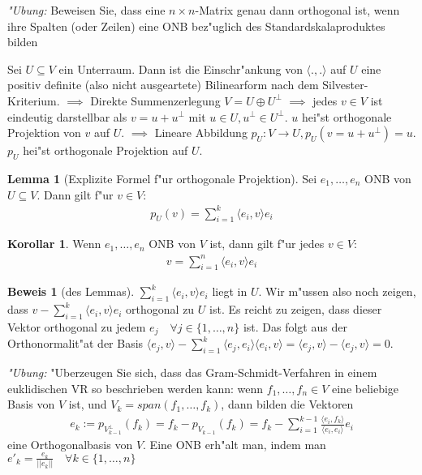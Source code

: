 \documentclass[oneside,fontsize=11pt,paper=a4,BCOR=0mm,DIV=12,automark,headsepline]{scrbook}
\theoremstyle{remark}
\theoremstyle{definition}
\newtheorem{lemma}{Lemma}[section]
\newtheorem*{korollar}{Korollar}
\theoremstyle{definition}
\newtheorem*{prof}{Beweis}
\theoremstyle{remark}
\begin{document}
  \emph{"Ubung:} Beweisen Sie, dass eine \(n\times n\)-Matrix genau dann orthogonal ist, wenn ihre Spalten (oder Zeilen) eine ONB bez"uglich des Standardskalaproduktes bilden

  Sei \(U\subseteq V\) ein Unterraum. Dann ist die Einschr"ankung von \(\langle ., .\rangle\) auf \(U\) eine positiv definite (also nicht ausgeartete) Bilinearform nach dem Silvester-Kriterium. \(\implies\) Direkte Summenzerlegung \(V = U\oplus U^\perp\) \(\implies\) jedes \(v\in V\) ist eindeutig darstellbar als \(v = u + u^\perp\) mit \(u\in U, u^\perp \in U^\perp\). \(u\) hei"st orthogonale Projektion von \(v\) auf \(U\). \(\implies\) Lineare Abbildung \(p_U: V\to U, p_U(v = u + u^\perp) = u\). \(p_U\) hei"st orthogonale Projektion auf \(U\).

\begin{lemma}[Explizite Formel f"ur orthogonale Projektion]
  Sei \(e_1, \dots, e_n\) ONB von \(U \subseteq V\). Dann gilt f"ur \(v\in V\):
  \begin{align*}
    p_U(v) = \sum_{i=1}^k\langle e_i, v\rangle e_i
  \end{align*}
\end{lemma}
\begin{korollar}
  Wenn \(e_1,\dots, e_n\) ONB von \(V\) ist, dann gilt f"ur jedes \(v \in V\):
  \begin{align*}
    v = \sum_{i=1}^n\langle e_i, v\rangle e_i
  \end{align*}
\end{korollar}
\begin{prof}[des Lemmas]
  \(\sum_{i=1}^k \langle e_i, v\rangle e_i\) liegt in \(U\). Wir m"ussen also noch zeigen, dass \(v - \sum_{i=1}^k\langle e_i, v\rangle e_i\) orthogonal zu \(U\) ist. Es reicht zu zeigen, dass dieser Vektor orthogonal zu jedem \(e_j \quad\forall j \in \{1,\dots, n\}\) ist. Das folgt aus der Orthonormalit"at der Basis \(\langle e_j, v\rangle - \sum_{i=1}^k \langle e_j, e_i\rangle\langle e_i, v\rangle = \langle e_j, v\rangle - \langle e_j, v\rangle = 0\).
\end{prof}


\emph{"Ubung:} "Uberzeugen Sie sich, dass das Gram-Schmidt-Verfahren in einem euklidischen VR so beschrieben werden kann: wenn \(f_1, \dots, f_n \in V\) eine beliebige Basis von \(V\) ist, und \(V_k = span(f_1, \dots, f_k)\), dann bilden die Vektoren \begin{align*}e_k := p_{V_{k-1}^\perp}(f_k) = f_k - p_{V_{k-1}}(f_k) = f_k - \sum_{i=1}^{k-1}\frac{\langle e_i, f_k\rangle}{\langle e_i, e_i\rangle}e_i\end{align*} eine Orthogonalbasis von \(V\). Eine ONB erh"alt man, indem man \(e'_k = \frac{e_k}{||e_k||} \quad\forall k\in \{1,\dots,n\}\)
\end{document}
